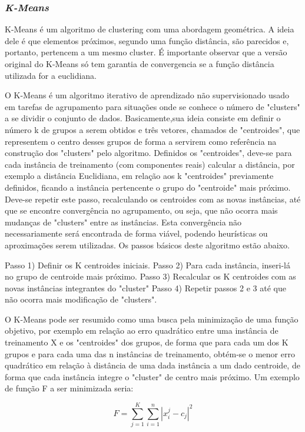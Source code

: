 \documentclass{article}
\begin{document}
\subsubsection{{\b \it K-Means}}
K-Means é um algoritmo de clustering com uma abordagem geométrica.
A ideia dele é que elementos próximos, segundo uma função distância, são parecidos e, portanto, pertencem a um mesmo cluster.
É importante observar que a versão original do K-Means só tem garantia de convergencia se a função distância utilizada for a euclidiana.



O K-Means é um algoritmo iterativo de aprendizado não supervisionado usado em tarefas de agrupamento para situações onde se conhece o número de "clusters" a se dividir o conjunto de dados. Basicamente,sua ideia consiste em definir o número k de grupos a serem obtidos e três vetores, chamados de "centroides", que representem o centro desses grupos de forma a servirem como referência na construção dos "clusters" pelo algoritmo. Definidos os "centroides", deve-se para cada instância de treinamento (com componentes reais) calcular a distância, por exemplo a distância Euclidiana, em relação aos k "centroides" previamente definidos, ficando a instância pertencente o grupo do "centroide" mais próximo. Deve-se repetir este passo, recalculando os centroides com as novas instâncias, até que se encontre convergência no agrupamento, ou seja, que não ocorra mais mudanças de "clusters" entre as instâncias. Esta convergência não necessariamente será encontrada de forma viável, podendo heurísticas ou aproximações serem utilizadas. Os passos básicos deste algoritmo estão abaixo.

	Passo 1) Definir os K centroides iniciais.
	Passo 2) Para cada instância, inseri-lá no grupo de centroide mais próximo.
	Passo 3) Recalcular os K centroides com as novas instâncias integrantes do "cluster"
	Passo 4) Repetir passos 2 e 3 até que não ocorra mais modificação de "clusters".

O K-Means pode ser resumido como uma busca pela minimização de uma função objetivo, por exemplo em relação ao erro quadrático entre uma instância de treinamento X e os "centroides" dos grupos, de forma que para cada um dos K grupos e para cada uma das n instâncias de treinamento, obtém-se o menor erro quadrático em relação à distância de uma dada instância a um dado centroide, de forma que cada instância integre o "cluster" de centro mais próximo. Um exemplo de função F a ser minimizada seria:

\begin{equation}
F = \sum_{j=1}^{K} \sum_{i=1}^{n} {|{x}_{i}^{j} - c_{j}|}^2
\end{equation}
\end{document}
